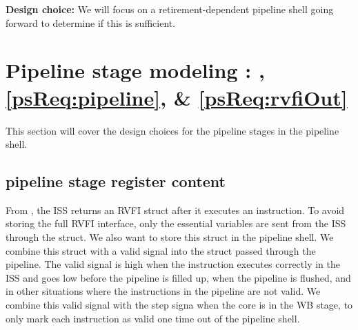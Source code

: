 \textbf{Design choice:} We will focus on a retirement-dependent pipeline shell going forward to determine if this is sufficient. 





\section{Pipeline stage modeling : , \ref{psReq:pipeline}, \& \ref{psReq:rvfiOut}}

This section will cover the design choices for the pipeline stages in the pipeline shell. 

\subsection{pipeline stage register content}

From , the ISS returns an RVFI struct after it executes an instruction. To avoid storing the full RVFI interface, only the essential variables are sent from the ISS through the  struct. We also want to store this struct in the pipeline shell.  We combine this struct with a valid signal into the  struct passed through the pipeline. The valid signal is high when the instruction executes correctly in the ISS and goes low before the pipeline is filled up, when the pipeline is flushed, and in other situations where the instructions in the pipeline are not valid. We combine this valid signal with the step signa when the core is in the WB stage, to only mark each instruction as valid one time out of the pipeline shell.

